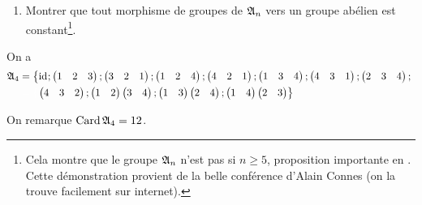\begin{exo}
\begin{enumerate}[resume=exoAn]
\item Montrer que tout morphisme de groupes de \(\frak{A}_{n}\) vers un groupe abélien est constant\footnote{Cela montre que le groupe \(\frak{A}_{n}\) n'est pas  si \(n\geq5\), proposition importante en . Cette démonstration provient de la belle conférence d'Alain Connes  (on la trouve facilement sur internet).}.
\end{enumerate}
\end{exo}

\begin{corr}[1]
On a \[\begin{aligned}
\frakA{4}&=\left\lbrace\id{};\begin{pmatrix}1 & 2 & 3\end{pmatrix};\begin{pmatrix}3 & 2 & 1\end{pmatrix};\begin{pmatrix}1 & 2 & 4\end{pmatrix};\begin{pmatrix}4 & 2 & 1\end{pmatrix};\begin{pmatrix}1 & 3 & 4\end{pmatrix};\begin{pmatrix}4 & 3 & 1\end{pmatrix};\begin{pmatrix}2 & 3 & 4\end{pmatrix};\right. \\
&\color{white}=\lbrace\color{black}\left.\begin{pmatrix}4 & 3 & 2\end{pmatrix};\begin{pmatrix}1 & 2\end{pmatrix}\begin{pmatrix}3 & 4\end{pmatrix};\begin{pmatrix}1 & 3\end{pmatrix}\begin{pmatrix}2 & 4\end{pmatrix};\begin{pmatrix}1 & 4\end{pmatrix}\begin{pmatrix}2 & 3\end{pmatrix}\right\rbrace
\end{aligned}\]

On remarque \(\operatorname{Card}\frak{A}_{4}=12\).
\end{corr}

